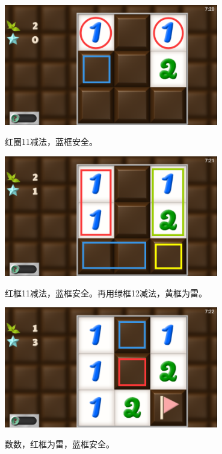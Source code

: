 \subsection{} %
\begin{center}
    \includegraphics[width=0.7\textwidth]{puzzle/4-1.png}
\end{center}
红圈11减法，蓝框安全。
\begin{center}
    \includegraphics[width=0.7\textwidth]{puzzle/4-2.png}
\end{center}
红框11减法，蓝框安全。再用绿框12减法，黄框为雷。
\begin{center}
    \includegraphics[width=0.7\textwidth]{puzzle/4-3.png}
\end{center}
数数，红框为雷，蓝框安全。

